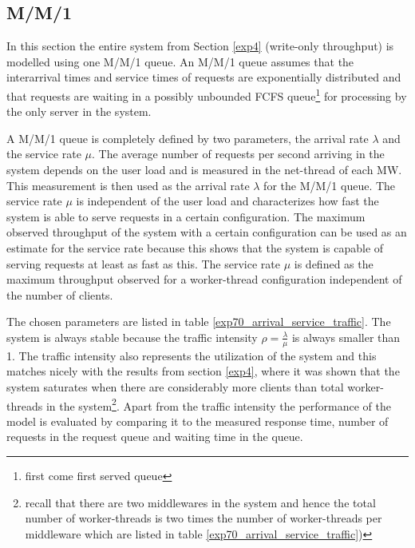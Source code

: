 \documentclass[report.tex]{subfiles}
\begin{document}
\subsection{M/M/1}

In this section the entire system from Section \ref{exp4} (write-only throughput) is modelled using one M/M/1 queue. An M/M/1 queue assumes that the interarrival times and service times of requests are exponentially distributed and that requests are waiting in a possibly unbounded FCFS queue\footnote{first come first served queue} for processing by the only server in the system.

A M/M/1 queue is completely defined by two parameters, the arrival rate $\lambda$ and the service rate $\mu$.
The average number of requests per second arriving in the system depends on the user load and is measured in the net-thread of each MW. This measurement is then used as the arrival rate $\lambda$ for the M/M/1 queue.
The service rate $\mu$ is independent of the user load and characterizes how fast the system is able to serve requests in a certain configuration.  
The maximum observed throughput of the system with a certain configuration can be used as an estimate for the service rate because this shows that the system is capable of serving requests at least as fast as this. 
The service rate $\mu$ is defined as the maximum throughput observed for a worker-thread configuration independent of the number of clients.

The chosen parameters are listed in table \ref{exp70_arrival_service_traffic}.
The system is always stable because the traffic intensity  $\rho= \frac{\lambda}{\mu}$ is always smaller than 1.
The traffic intensity also represents the utilization of the system and this matches nicely with the results from section \ref{exp4}, where it was shown that the system saturates when there are considerably more clients than total worker-threads in the system\footnote{recall that there are two middlewares in the system and hence the total number of worker-threads is two times the number of worker-threads per middleware which are listed in table \ref{exp70_arrival_service_traffic})}.
Apart from the traffic intensity the performance of the model is evaluated by comparing it to the measured response time, number of requests in the request queue and waiting time in the queue.
\end{document}
